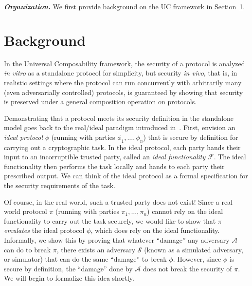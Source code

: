 \documentclass{llncs}
\newcommand{\mc}[1]{\mathcal{{#1}}}
\newcommand{\parheader}[1]{\noindent\emph{\textbf{{#1}.}}}
\begin{document}
\parheader{Organization} We first provide background on the UC framework in Section~\ref{sec:background}.

\section{Background}\label{sec:background}

In the Universal Composability framework, the security of a protocol is
analyzed \emph{in vitro} as a standalone protocol for simplicity, but
security \emph{in vivo}, that is, in realistic settings where the protocol can
run concurrently with arbitrarily many (even adversarially controlled)
protocols, is guaranteed by showing that security is preserved under a general
composition operation on protocols.

Demonstrating that a protocol meets its security definition in the standalone
model goes back to the real/ideal paradigm introduced
in~\cite{goldreich1987play}. First, envision an \emph{ideal protocol} $\phi$
(running with parties $\phi_1, \ldots, \phi_n$) that is secure by definition for
carrying out a cryptographic task. In the ideal protocol, each party hands their
input to an incorruptible trusted party, called an \emph{ideal functionality}
$\mc{F}$. The ideal functionality then performs the task locally and hands to
each party their prescribed output. We can think of the ideal protocol as a
formal specification for the security requirements of the task.

Of course, in the real world, such a trusted party does not exist! Since a real
world protocol $\pi$ (running with parties $\pi_1, \ldots, \pi_n$) cannot rely
on the ideal functionality to carry out the task securely, we would like to show
that $\pi$ \emph{emulates} the ideal protocol $\phi$, which does rely on the
ideal functionality. Informally, we show this by proving that whatever
``damage'' any adversary $\mc{A}$ can do to break $\pi$, there exists an
adversary $\mc{S}$ (known as a simulated adversary, or simulator) that can do
the same ``damage'' to break $\phi$. However, since $\phi$ is secure by
definition, the ``damage'' done by $\mc{A}$ does not break the security of
$\pi$. We will begin to formalize this idea shortly.
\end{document}
